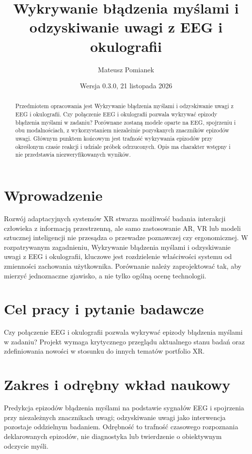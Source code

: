 \documentclass[11pt,a4paper]{article}
\title{Wykrywanie błądzenia myślami i odzyskiwanie uwagi z EEG i okulografii}
\author{Mateusz Pomianek}
\date{Wersja 0.3.0, 21 listopada 2026}
\begin{document}
\maketitle

\begin{abstract}

Przedmiotem opracowania jest Wykrywanie błądzenia myślami i odzyskiwanie uwagi z EEG i okulografii. Czy połączenie EEG i okulografii pozwala wykrywać epizody błądzenia myślami w zadaniu? Porównane zostaną modele oparte na EEG, spojrzeniu i obu modalnościach, z wykorzystaniem niezależnie pozyskanych znaczników epizodów uwagi. Głównym punktem końcowym jest trafność wykrywania epizodów przy określonym czasie reakcji i udziale próbek odrzuconych. Opis ma charakter wstępny i nie przedstawia niezweryfikowanych wyników.

\end{abstract}

\section{Wprowadzenie}

Rozwój adaptacyjnych systemów XR stwarza możliwość badania interakcji człowieka z informacją przestrzenną, ale samo zastosowanie AR, VR lub modeli sztucznej inteligencji nie przesądza o przewadze poznawczej czy ergonomicznej. W rozpatrywanym zagadnieniu, Wykrywanie błądzenia myślami i odzyskiwanie uwagi z EEG i okulografii, kluczowe jest rozdzielenie właściwości systemu od zmienności zachowania użytkownika. Porównanie należy zaprojektować tak, aby mierzyć jednoznaczne zjawisko, a nie tylko ogólną ocenę technologii.

\section{Cel pracy i pytanie badawcze}

Czy połączenie EEG i okulografii pozwala wykrywać epizody błądzenia myślami w zadaniu? Projekt wymaga krytycznego przeglądu aktualnego stanu badań oraz zdefiniowania nowości w stosunku do innych tematów portfolio XR.

\section{Zakres i odrębny wkład naukowy}
Predykcja epizodów błądzenia myślami na podstawie sygnałów EEG i spojrzenia przy niezależnych znacznikach uwagi; odzyskiwanie uwagi jako interwencja pozostaje oddzielnym badaniem. Odrębność to trafność czasowego rozpoznania deklarowanych epizodów, nie diagnostyka lub twierdzenie o obiektywnym odczycie myśli.
\end{document}
